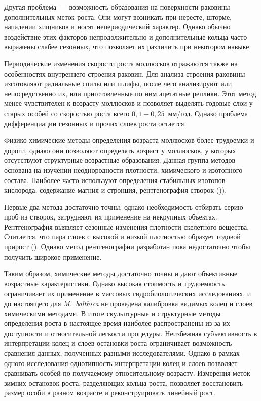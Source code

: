 Другая проблема~--- возможность образования на поверхности раковины дополнительных меток роста. 
Они могут возникать при нересте, шторме, нападении хищников и носят непериодический характер. 
Однако обычно воздействие этих факторов непродолжительно и дополнительные кольца часто выражены слабее сезонных, что позволяет их различить при некотором навыке. 

Периодические изменения скорости роста моллюсков отражаются также на особенностях внутреннего строения раковин. 
Для анализа строения раковины изготовляют радиальные спилы или шлифы, после чего анализируют или непосредственно их, или приготовленные по ним ацетатные реплики.
Этот метод менее чувствителен к возрасту моллюсков и позволяет выделять годовые слои у старых особей со скоростью роста всего $0,1-0,25$~мм/год. 
Однако проблема дифференциации сезонных и прочих слоев роста остается.

Физико-химические методы определения возраста моллюсков более трудоемки и дороги, однако они позволяют определять возраст у моллюсков, у которых отсутствуют структурные возрастные образования. Данная группа методов основана на изучении неоднородности плотности, химического и изотопного состава. Наиболее часто используют определения стабильных изотопов кислорода, содержание магния и стронция, рентгенография створок (\cite{Zolotarev_1989})). 

Первые два метода достаточно точны, однако необходимость отбирать серию проб из створок, затрудняют их применение на некрупных объектах. 
Рентгенография выявляет сезонные изменения плотности скелетного вещества. 
Считается, что пара слоев с высокой и низкой плотностью образует годовой прирост (\cite{Ralph_Maxwell_1977}). 
Однако метод рентгенографии разработан пока недостаточно чтобы получить широкое применение. 

Таким образом, химические методы достаточно точны и дают объективные возрастные характеристики. 
Однако высокая стоимость и трудоемкость ограничивает их применение в массовых гидробиологических исследованиях, и до настоящего для \textit{M.~balthica} не проведена калибровка видимых колец и слоев химическими методами. 
В итоге скульптурные и структурные методы определения роста в настоящее время наиболее распространены из-за их доступности и относительной легкости процедуры. 
Неизбежная субъективность в интерпретации колец и слоев остановки роста ограничивает возможность сравнения данных, полученных разными исследователями. 
Однако в рамках одного исследования однотипность интерпретации колец и слоев позволяет сравнивать особей по получаемому относительному возрасту. 
Измерения меток зимних остановок роста, разделяющих кольца роста, позволяет восстановить размер особи в разном возрасте и реконструировать линейный рост.


